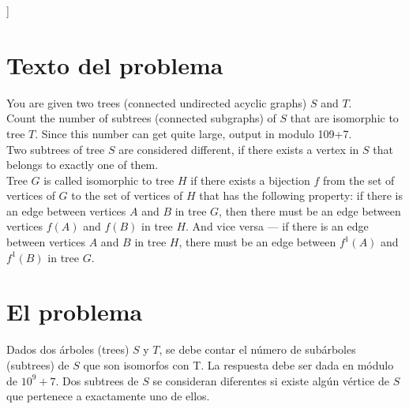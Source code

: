 \documentclass[a4paper,12pt,twocolumn]{article}
\begin{document}



\vspace{0.8cm}
]



\section{Texto del problema}
You are given two trees (connected undirected acyclic graphs) $S$ and $T$.\\

Count the number of subtrees (connected subgraphs) of $S$ that are isomorphic to tree $T$. Since this number can get quite large, output in modulo 109+7.\\

Two subtrees of tree $S$ are considered different, if there exists a vertex in $S$ that belongs to exactly one of them.\\

Tree $G$ is called isomorphic to tree $H$ if there exists a bijection $f$ from the set of vertices of $G$ to the set of vertices of $H$ that has the following property: if there is an edge between vertices $A$ and $B$ in tree $G$, then there must be an edge between vertices $f(A)$ and $f(B)$ in tree $H$. And vice versa — if there is an edge between vertices $A$ and $B$ in tree $H$, there must be an edge between $f^1(A)$ and $f^1(B)$ in tree $G$.

\section{El problema}\label{sec:intro}

  Dados dos árboles (trees) $S$ y $T$, se debe contar el número de subárboles (subtrees) de $S$ que son isomorfos con T. La respuesta debe ser dada en módulo de $10^9 + 7$.
  Dos subtrees de $S$ se consideran diferentes si existe algún vértice de $S$ que pertenece a exactamente uno de ellos.\\
  
\end{document}
